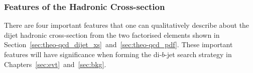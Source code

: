 
\subsubsection{Features of the Hadronic Cross-section}
\label{sec:theo-qcd-dijet_features}

There are four important features that one can qualitatively describe about the dijet hadronic cross-section
from the two factorised elements shown in Section~\ref{sec:theo-qcd_dijet_xs}~and~\ref{sec:theo-qcd_pdf}.
These important features will have significance when forming the di-$b$-jet search strategy in Chapters~\ref{sec:evt}~and~\ref{sec:bkg}.

